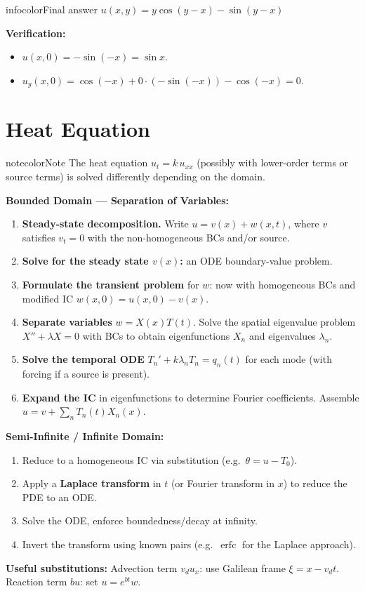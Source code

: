 \documentclass[a4paper,11pt]{article} %
\newenvironment{notebox}[1][]{\begin{custombox}[#1]{notecolor}{Note}}{\end{custombox}}
\newenvironment{summarybox}[1][]{\begin{custombox}[#1]{infocolor}{Final answer}}{\end{custombox}}
\begin{document}
\begin{summarybox}
$u(x,y)=y\cos(y-x)-\sin(y-x)$
\end{summarybox}

\textbf{Verification:}
\begin{itemize}
    \item $u(x,0)=-\sin(-x)=\sin x$. \checkmark
    \item $u_y(x,0)=\cos(-x)+0\cdot(-\sin(-x))-\cos(-x)=0$. \checkmark
\end{itemize}

\newpage

\section{Heat Equation}
\vspace{-1cm}
\begin{notebox}[title={General Procedure: Solving the Heat Equation}]
The heat equation $u_t = k\,u_{xx}$ (possibly with lower-order terms or source terms) is solved differently depending on the domain.

\textbf{Bounded Domain --- Separation of Variables:}
\begin{enumerate}
    \item \textbf{Steady-state decomposition.} Write $u = v(x) + w(x,t)$, where $v$ satisfies $v_t=0$ with the non-homogeneous BCs and/or source.
    \item \textbf{Solve for the steady state $v(x)$:} an ODE boundary-value problem.
    \item \textbf{Formulate the transient problem} for $w$: now with homogeneous BCs and modified IC $w(x,0)=u(x,0)-v(x)$.
    \item \textbf{Separate variables} $w = X(x)T(t)$. Solve the spatial eigenvalue problem $X''+\lambda X = 0$ with BCs to obtain eigenfunctions $X_n$ and eigenvalues $\lambda_n$.
    \item \textbf{Solve the temporal ODE} $T_n' + k\lambda_n T_n = q_n(t)$ for each mode (with forcing if a source is present).
    \item \textbf{Expand the IC} in eigenfunctions to determine Fourier coefficients. Assemble $u = v + \sum_n T_n(t)X_n(x)$.
\end{enumerate}
\textbf{Semi-Infinite / Infinite Domain:}
\begin{enumerate}
    \item Reduce to a homogeneous IC via substitution (e.g.\ $\theta = u - T_0$).
    \item Apply a \textbf{Laplace transform} in $t$ (or Fourier transform in $x$) to reduce the PDE to an ODE.
    \item Solve the ODE, enforce boundedness/decay at infinity.
    \item Invert the transform using known pairs (e.g.\ $\operatorname{erfc}$ for the Laplace approach).
\end{enumerate}
\textbf{Useful substitutions:} Advection term $v_d u_x$: use Galilean frame $\xi=x-v_d t$.  Reaction term $bu$: set $u=e^{bt}w$.
\end{notebox}
\end{document}
